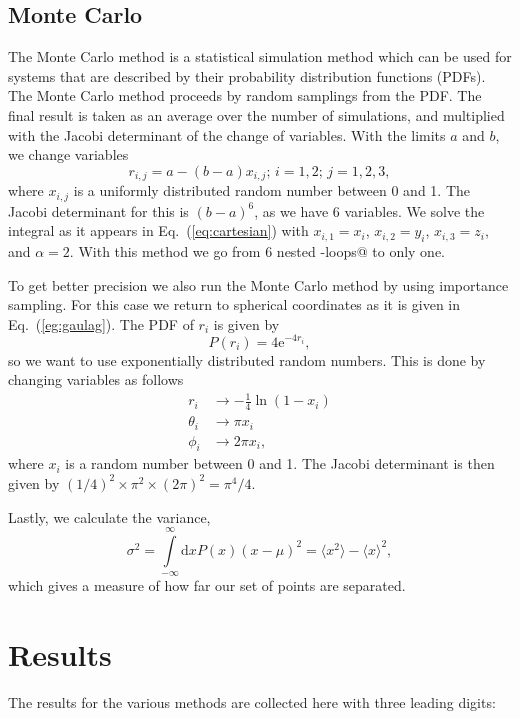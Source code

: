 \documentclass{article}
\begin{document}
\begin{multicols}{2}
\subsection{Monte Carlo}
The Monte Carlo method is a statistical simulation method which can be used for systems that are described by their probability distribution functions (PDFs). The Monte Carlo method proceeds by random samplings from the PDF. The final result is taken as an average over the number of simulations, and multiplied with the Jacobi determinant of the change of variables. With the limits $a$ and $b$, we change variables 
\begin{equation}
	r_{i,j} = a - (b-a)x_{i,j};\,i=1,2;\,j=1,2,3,
\end{equation}
where $x_{i,j}$ is a uniformly distributed random number between 0 and 1.
The Jacobi determinant for this is $(b-a)^6$, as we have 6 variables.
We solve the integral as it appears in Eq.~(\ref{eq:cartesian}) with $x_{i,1} = x_i$, $x_{i,2} = y_i$, $x_{i,3} = z_i$, and $\alpha=2$. With this method we go from 6 nested \verb@for-loops@ to only one.

To get better precision we also run the Monte Carlo method by using importance sampling. For this case we return to spherical coordinates as it is given in Eq.~(\ref{eg:gaulag}). The PDF of $r_i$ is given by
\begin{equation}
	P(r_i)=4\mathrm{e}^{-4r_i},
\end{equation}
so we want to use exponentially distributed random numbers. This is done by changing variables as follows
\begin{align*}
	r_i &\rightarrow -\frac{1}{4}\ln(1-x_i) \\
	\theta_i &\rightarrow \pi x_i \\
	\phi_i &\rightarrow 2\pi x_i,
\end{align*}
where $x_i$ is a random number between 0 and 1.
The Jacobi determinant is then given by $(1/4)^2\times\pi^2\times(2\pi)^2 = \pi^4/4$.

Lastly, we calculate the variance, 
\begin{equation}\label{eq:variance}
	\sigma^2 = \int\limits_{-\infty}^{\infty}\mathrm{d}xP(x)(x-\mu)^2 = \langle x^2\rangle-\langle x\rangle^2,
\end{equation}
which gives a measure of how far our set of points are separated.


\section{Results}
The results for the various methods are collected here with three leading digits:


\end{multicols}
\end{document}

